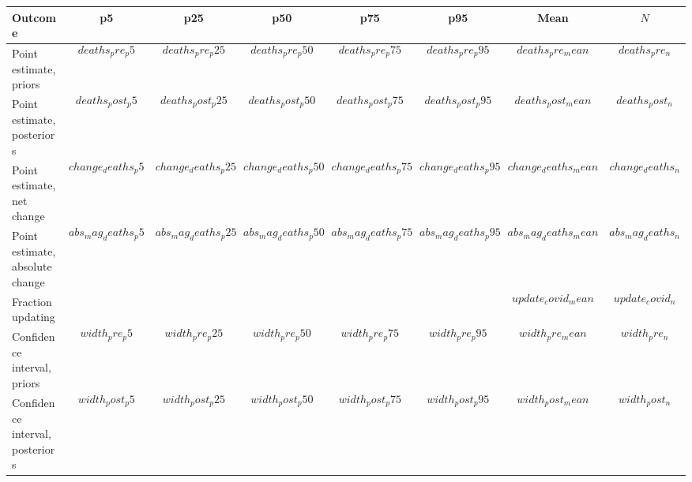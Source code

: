 \begin{tabular}{l c c c c c c c}
  \hline
  \hline
  Outcome & p5 & p25 & p50 & p75 & p95 & Mean & $N$ \\
  \hline
  Point estimate, priors & $$deaths_pre_p5$$ & $$deaths_pre_p25$$
                     & $$deaths_pre_p50$$ & $$deaths_pre_p75$$
                                 & $$deaths_pre_p95$$
                                       & $$deaths_pre_mean$$ & $$deaths_pre_n$$ \\
  Point estimate, posteriors & $$deaths_post_p5$$
               & $$deaths_post_p25$$ & $$deaths_post_p50$$
                           & $$deaths_post_p75$$ & $$deaths_post_p95$$
                                       & $$deaths_post_mean$$ & $$deaths_post_n$$ \\
  Point estimate, net change & $$change_deaths_p5$$
               & $$change_deaths_p25$$ & $$change_deaths_p50$$
                           & $$change_deaths_p75$$
                                 & $$change_deaths_p95$$
                                       & $$change_deaths_mean$$ & $$change_deaths_n$$ \\
  Point estimate, absolute change & $$abs_mag_deaths_p5$$
               & $$abs_mag_deaths_p25$$ & $$abs_mag_deaths_p50$$
                           & $$abs_mag_deaths_p75$$
                                 & $$abs_mag_deaths_p95$$
                                       & $$abs_mag_deaths_mean$$
                                              & $$abs_mag_deaths_n$$ \\
  Fraction updating & & &  & & & $$update_covid_mean$$
                                              & $$update_covid_n$$ \\  
  Confidence interval, priors & $$width_pre_p5$$ & $$width_pre_p25$$
                     & $$width_pre_p50$$ & $$width_pre_p75$$
                                 & $$width_pre_p95$$
                                       & $$width_pre_mean$$ & $$width_pre_n$$ \\
  Confidence interval, posteriors & $$width_post_p5$$
               & $$width_post_p25$$ & $$width_post_p50$$
                           & $$width_post_p75$$ & $$width_post_p95$$
                                       & $$width_post_mean$$ & $$width_post_n$$
  \\    
  \hline
  \hline
\end{tabular}

